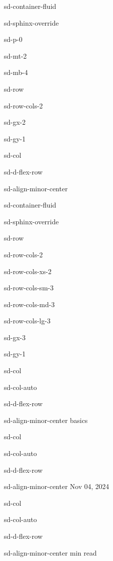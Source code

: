 \documentclass[letterpaper,10pt,english]{jupyterBook}
\begin{document}
\begin{sphinxuseclass}{sd-container-fluid}
\begin{sphinxuseclass}{sd-sphinx-override}
\begin{sphinxuseclass}{sd-p-0}
\begin{sphinxuseclass}{sd-mt-2}
\begin{sphinxuseclass}{sd-mb-4}
\begin{sphinxuseclass}{sd-row}
\begin{sphinxuseclass}{sd-row-cols-2}
\begin{sphinxuseclass}{sd-gx-2}
\begin{sphinxuseclass}{sd-gy-1}
\begin{sphinxuseclass}{sd-col}
\begin{sphinxuseclass}{sd-d-flex-row}
\begin{sphinxuseclass}{sd-align-minor-center}
\begin{sphinxuseclass}{sd-container-fluid}
\begin{sphinxuseclass}{sd-sphinx-override}
\begin{sphinxuseclass}{sd-row}
\begin{sphinxuseclass}{sd-row-cols-2}
\begin{sphinxuseclass}{sd-row-cols-xs-2}
\begin{sphinxuseclass}{sd-row-cols-sm-3}
\begin{sphinxuseclass}{sd-row-cols-md-3}
\begin{sphinxuseclass}{sd-row-cols-lg-3}
\begin{sphinxuseclass}{sd-gx-3}
\begin{sphinxuseclass}{sd-gy-1}
\begin{sphinxuseclass}{sd-col}
\begin{sphinxuseclass}{sd-col-auto}
\begin{sphinxuseclass}{sd-d-flex-row}
\begin{sphinxuseclass}{sd-align-minor-center}
\sphinxAtStartPar
basics

\end{sphinxuseclass}
\end{sphinxuseclass}
\end{sphinxuseclass}
\end{sphinxuseclass}
\begin{sphinxuseclass}{sd-col}
\begin{sphinxuseclass}{sd-col-auto}
\begin{sphinxuseclass}{sd-d-flex-row}
\begin{sphinxuseclass}{sd-align-minor-center}
\sphinxAtStartPar
Nov 04, 2024

\end{sphinxuseclass}
\end{sphinxuseclass}
\end{sphinxuseclass}
\end{sphinxuseclass}
\begin{sphinxuseclass}{sd-col}
\begin{sphinxuseclass}{sd-col-auto}
\begin{sphinxuseclass}{sd-d-flex-row}
\begin{sphinxuseclass}{sd-align-minor-center}
 min read


\end{sphinxuseclass}
\end{sphinxuseclass}
\end{sphinxuseclass}
\end{sphinxuseclass}
\end{sphinxuseclass}
\end{sphinxuseclass}
\end{sphinxuseclass}
\end{sphinxuseclass}
\end{sphinxuseclass}
\end{sphinxuseclass}
\end{sphinxuseclass}
\end{sphinxuseclass}
\end{sphinxuseclass}
\end{sphinxuseclass}
\end{sphinxuseclass}
\end{sphinxuseclass}
\end{sphinxuseclass}
\end{sphinxuseclass}
\end{sphinxuseclass}
\end{sphinxuseclass}
\end{sphinxuseclass}
\end{sphinxuseclass}
\end{sphinxuseclass}
\end{sphinxuseclass}
\end{sphinxuseclass}
\end{sphinxuseclass}
\end{document}

